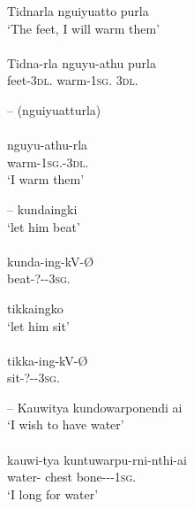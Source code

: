 \documentclass{langscibook}
\begin{document}
\begin{xlist}
\ea\label{ex:5:17}
Tidnarla     	nguiyuatto      	purla \\
\glt `The feet, I will warm them' \\
\citep[23]{teichelmann_outlines_1840} \\
\gll Tidna-rla   	nguyu-athu      	purla \\
feet-3\textsc{dl}.       warm-1\textsc{sg}.     3\textsc{dl}.                                    \\
\z




--
\ea\label{ex:5:18}
(nguiyuatturla)	\\
\citep[23]{teichelmann_outlines_1840} \\
\gll nguyu-athu-rla \\
warm-1\textsc{sg}.-3\textsc{dl}.                              \\
\glt `I warm them'
\z




--
\ea\label{ex:5:19}
kundaingki \\
\glt       ‘let him beat’ \\
\citep[17]{teichelmann_outlines_1840} \\
\gll kunda-ing-kV-Ø \\
beat-?--3\textsc{sg}.\\
\z

\ea\label{ex:5:20}
tikkaingko \\
\glt ‘let him sit’ \\
\citep[17]{teichelmann_outlines_1840} \\
\gll tikka-ing-kV-Ø\\
sit-?--3\textsc{sg}.\\
\z




--
\ea\label{ex:5:21}
Kauwitya        kundowarponendi ai \\
\glt `I wish to have water' \\
\citep{teichelmann_outlines_1840} \\
\gll kauwi-tya       kuntuwarpu-rni-nthi-ai \\
water-    {chest bone---1\textsc{sg}.\footnotemark}                               \\
\glt `I long for water'
\z



\end{xlist}
\end{document}
